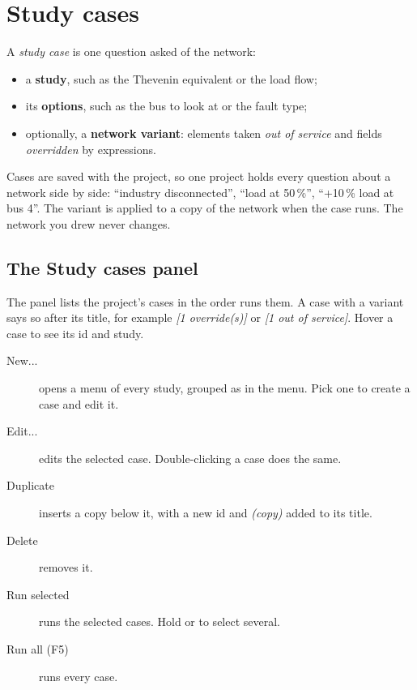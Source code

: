 \chapter{Study cases}\label{ch:cases}

A \emph{study case} is one question asked of the network:

\begin{itemize}
  \item a \textbf{study}, such as the Thevenin equivalent or the load flow;
  \item its \textbf{options}, such as the bus to look at or the fault type;
  \item optionally, a \textbf{network variant}: elements taken \emph{out of service} and
    fields \emph{overridden} by expressions.
\end{itemize}

Cases are saved with the project, so one project holds every question about a network
side by side: ``industry disconnected'', ``load at 50\,\%'', ``+10\,\% load at bus 4''.
The variant is applied to a copy of the network when the case runs. The network you drew
never changes.

\section{The Study cases panel}

\begin{minipage}[t]{0.5\linewidth}
The panel lists the project's cases in the order  runs them. A case with a
variant says so after its title, for example \emph{[1 override(s)]} or \emph{[1 out of
service]}. Hover a case to see its id and study.

\begin{description}
  \item[New...] opens a menu of every study, grouped as in the  menu.
    Pick one to create a case and edit it.
  \item[Edit...] edits the selected case. Double-clicking a case does the same.
  \item[Duplicate] inserts a copy below it, with a new id and \emph{(copy)} added to its
    title.
  \item[Delete] removes it.
  \item[Run selected] runs the selected cases. Hold \keys{\ctrl} or \keys{\shift} to
    select several.
  \item[Run all (F5)] runs every case.
\end{description}
\end{minipage}\hfill
\begin{minipage}[t]{0.45\linewidth}\vspace{0pt}
  \centering{}
\end{minipage}

